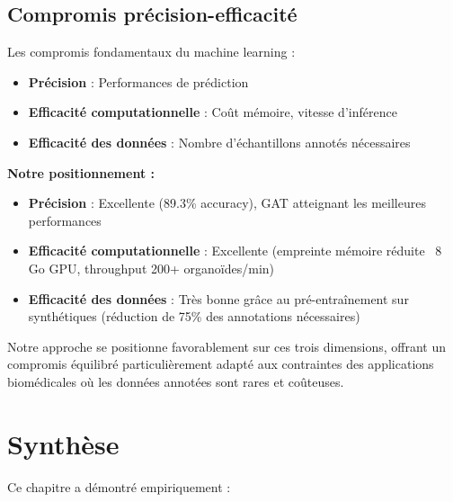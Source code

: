 \subsection{Compromis précision-efficacité}

Les compromis fondamentaux du machine learning :
\begin{itemize}
    \item \textbf{Précision} : Performances de prédiction
    \item \textbf{Efficacité computationnelle} : Coût mémoire, vitesse d'inférence
    \item \textbf{Efficacité des données} : Nombre d'échantillons annotés nécessaires
\end{itemize}

\textbf{Notre positionnement :}
\begin{itemize}
    \item \textbf{Précision} : Excellente (89.3\% accuracy), GAT atteignant les meilleures performances
    \item \textbf{Efficacité computationnelle} : Excellente (empreinte mémoire réduite ~8 Go GPU, throughput 200+ organoïdes/min)
    \item \textbf{Efficacité des données} : Très bonne grâce au pré-entraînement sur synthétiques (réduction de 75\% des annotations nécessaires)
\end{itemize}

Notre approche se positionne favorablement sur ces trois dimensions, offrant un compromis équilibré particulièrement adapté aux contraintes des applications biomédicales où les données annotées sont rares et coûteuses.

\section{Synthèse}

Ce chapitre a démontré empiriquement :

